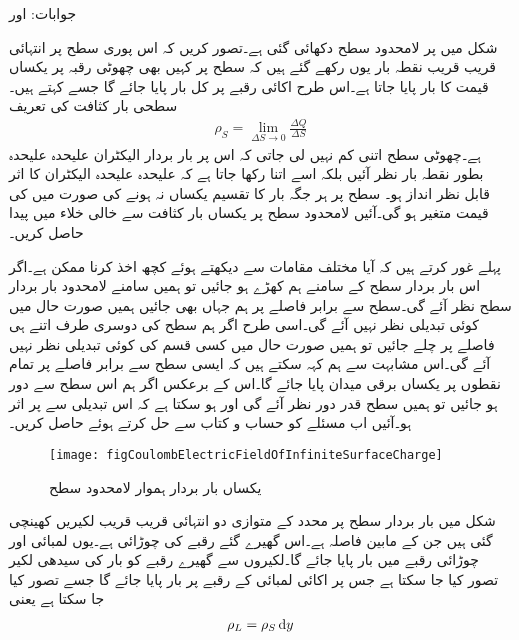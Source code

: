 جوابات: اور 

شکل  میں   پر لامحدود  سطح دکھائی گئی ہے۔تصور کریں کہ اس پوری  سطح پر انتہائی قریب قریب نقطہ بار یوں رکھے گئے ہیں کہ سطح پر کہیں بھی چھوٹی رقبہ  پر  یکساں قیمت کا بار  پایا جاتا ہے۔اس طرح اکائی رقبے پر کل  بار پایا جائے گا جسے   کہتے ہیں۔سطحی بار کثافت کی تعریف
\begin{align}\label{مساوات_کولمب_سطحی_کثافت_تعریف}
\rho_S=\lim_{\Delta S \to 0}\frac{\Delta Q}{\Delta S}
\end{align}
ہے۔چھوٹی سطح اتنی کم نہیں لی جاتی کہ اس پر بار بردار الیکٹران علیحدہ علیحدہ بطور نقطہ بار نظر آئیں بلکہ اسے اتنا رکھا جاتا ہے کہ علیحدہ علیحدہ الیکٹران کا اثر قابل نظر انداز ہو۔ سطح پر ہر جگہ بار کا تقسیم یکساں نہ ہونے کی صورت میں  کی قیمت متغیر ہو گی۔آئیں لامحدود سطح پر یکساں بار کثافت سے خالی خلاء میں  پیدا  حاصل کریں۔

پہلے غور کرتے ہیں کہ آیا مختلف مقامات سے  دیکھتے ہوئے کچھ اخذ کرنا ممکن ہے۔اگر اس بار بردار سطح کے سامنے ہم کھڑے ہو جائیں تو ہمیں سامنے لامحدود بار بردار سطح نظر آئے گی۔سطح سے برابر فاصلے پر ہم جہاں بھی جائیں ہمیں صورت حال میں کوئی تبدیلی نظر نہیں آئے گی۔اسی طرح اگر ہم سطح کی دوسری طرف اتنے ہی فاصلے پر چلے جائیں تو ہمیں صورت حال میں کسی قسم کی کوئی تبدیلی نظر نہیں آئے گی۔اس مشابہت سے ہم کہہ سکتے ہیں کہ ایسی سطح سے برابر فاصلے پر تمام نقطوں  پر یکساں برقی میدان پایا جائے گا۔اس کے برعکس اگر ہم اس سطح سے دور ہو جائیں تو ہمیں سطح قدر دور نظر آئے گی اور ہو سکتا ہے کہ اس تبدیلی سے  پر اثر ہو۔آئیں اب مسئلے کو حساب و کتاب سے حل کرتے ہوئے  حاصل کریں۔
\begin{figure}
\centering
\texttt{[image: figCoulombElectricFieldOfInfiniteSurfaceCharge]}
\caption{یکساں بار بردار ہموار لامحدود سطح}
\label{شکل_کولمب_لامحدود_سطح_پر_بار}
\end{figure}

شکل   میں بار بردار سطح پر   محدد کے متوازی دو انتہائی قریب قریب لکیریں کھینچی گئی ہیں جن کے مابین فاصلہ  ہے۔اس گھیرے گئے رقبے کی چوڑائی  ہے۔یوں  لمبائی اور  چوڑائی رقبے میں  بار پایا جائے گا۔لکیروں سے گھیرے رقبے کو بار کی سیدھی لکیر تصور کیا جا سکتا ہے جس پر اکائی لمبائی کے رقبے پر  بار پایا جائے گا جسے  تصور کیا جا سکتا ہے یعنی
\begin{align}
\rho_L=\rho_S \dif y
\end{align}

